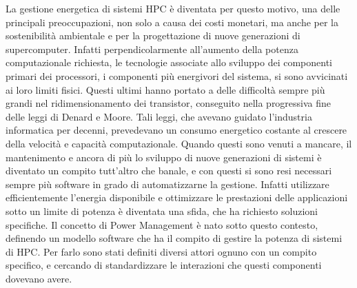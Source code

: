 La gestione energetica di sistemi HPC è diventata per questo motivo, una delle principali preoccupazioni, non solo a causa dei costi monetari, ma anche per la sostenibilità ambientale e per la progettazione di nuove generazioni\cite{TODO} di supercomputer. Infatti perpendicolarmente all'aumento della potenza computazionale richiesta, le tecnologie associate allo sviluppo dei componenti primari dei processori, i componenti più energivori del sistema, si sono avvicinati ai loro limiti fisici.
Questi ultimi hanno portato a delle difficoltà sempre più grandi nel ridimensionamento dei transistor, conseguito nella progressiva fine delle leggi di Denard e Moore\cite{TODO}. Tali leggi, che avevano guidato l'industria informatica per decenni, prevedevano un consumo energetico costante al crescere della velocità e capacità computazionale. Quando questi sono venuti a mancare, il mantenimento e ancora di più lo sviluppo di nuove generazioni di sistemi è diventato un compito tutt'altro che banale, e con questi si sono resi necessari sempre più software in grado di automatizzarne la gestione. 
Infatti utilizzare efficientemente l'energia disponibile e ottimizzare le prestazioni delle applicazioni sotto un limite di potenza è diventata una sfida, che ha richiesto soluzioni specifiche. %
Il concetto di Power Management è nato sotto questo contesto, definendo un modello software che ha il compito di gestire la potenza %
di sistemi di HPC. Per farlo sono stati definiti diversi attori ognuno con un compito specifico, e cercando di standardizzare le interazioni che questi componenti dovevano avere.

